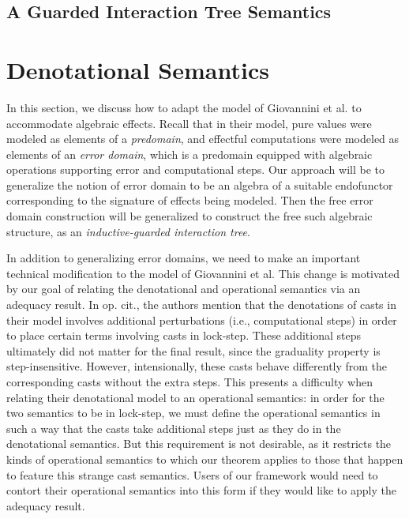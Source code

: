 \documentclass[acmsmall, screen]{acmart}
\theoremstyle{remark}
\begin{document}
\subsection{A Guarded Interaction Tree Semantics}


\section{Denotational Semantics}\label{sec:denotational-semantics}

In this section, we discuss how to adapt the model of Giovannini et al.
\cite{gtt-sgdt} to accommodate algebraic effects. Recall that in their model,
pure values were modeled as elements of a \emph{predomain}, and effectful
computations were modeled as elements of an \emph{error domain}, which is a
predomain equipped with algebraic operations supporting error and computational
steps. Our approach will be to generalize the notion of error domain to be an
algebra of a suitable endofunctor corresponding to the signature of effects
being modeled. Then the free error domain construction will be generalized to
construct the free such algebraic structure, as an \emph{inductive-guarded
interaction tree}.

In addition to generalizing error domains, we need to make an important
technical modification to the model of Giovannini et al. This change is
motivated by our goal of relating the denotational and operational semantics via
an adequacy result. In op. cit., the authors mention that the denotations of
casts in their model involves additional perturbations (i.e., computational
steps) in order to place certain terms involving casts in lock-step. These
additional steps ultimately did not matter for the final result, since the
graduality property is step-insensitive. However, intensionally, these casts
behave differently from the corresponding casts without the extra steps.
%
This presents a difficulty when relating their denotational model to an
operational semantics: in order for the two semantics to be in lock-step, we
must define the operational semantics in such a way that the casts take
additional steps just as they do in the denotational semantics. But this
requirement is not desirable, as it restricts the kinds of operational semantics
to which our theorem applies to those that happen to feature this strange cast
semantics. Users of our framework would need to contort their operational
semantics into this form if they would like to apply the adequacy result.
\end{document}
